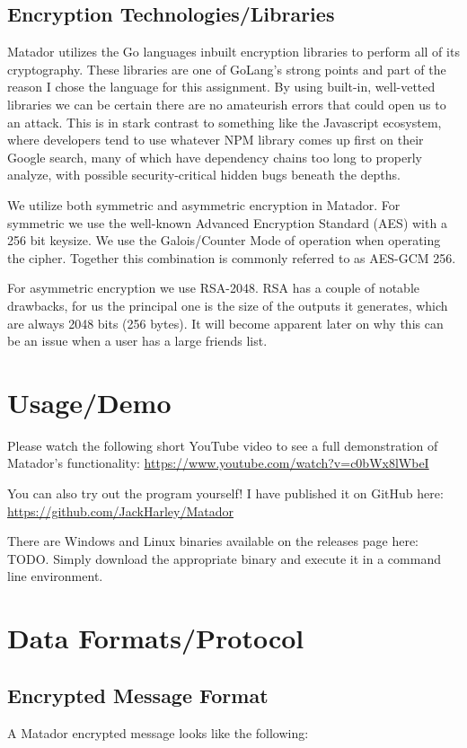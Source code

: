 \documentclass{article}[12pt]
\begin{document}
	\subsection{Encryption Technologies/Libraries}
		Matador utilizes the Go languages inbuilt encryption libraries to perform all of its cryptography. These libraries are one of GoLang's strong points and part of the reason I chose the language for this assignment. By using built-in, well-vetted libraries we can be certain there are no amateurish errors that could open us to an attack. This is in stark contrast to something like the Javascript ecosystem, where developers tend to use whatever NPM library comes up first on their Google search, many of which have dependency chains too long to properly analyze, with possible security-critical hidden bugs beneath the depths.
		
		We utilize both symmetric and asymmetric encryption in Matador. For symmetric we use the well-known Advanced Encryption Standard (AES) with a 256 bit keysize. We use the Galois/Counter Mode of operation when operating the cipher. Together this combination is commonly referred to as AES-GCM 256.
		
		For asymmetric encryption we use RSA-2048. RSA has a couple of notable drawbacks, for us the principal one is the size of the outputs it generates, which are always 2048 bits (256 bytes). It will become apparent later on why this can be an issue when a user has a large friends list.
	
	\section{Usage/Demo}
		Please watch the following short YouTube video to see a full demonstration of Matador's functionality: \url{https://www.youtube.com/watch?v=c0bWx8lWbeI}
		
		You can also try out the program yourself! I have published it on GitHub here: \url{https://github.com/JackHarley/Matador}
		
		There are Windows and Linux binaries available on the releases page here: TODO. Simply download the appropriate binary and execute it in a command line environment.
	
	\newpage
	
	\section{Data Formats/Protocol}
	
	\subsection{Encrypted Message Format}
		A Matador encrypted message looks like the following:
		
\end{document}
